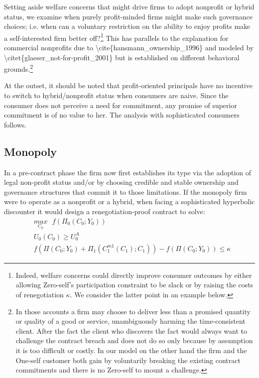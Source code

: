 \documentclass[11pt,english]{article}
\theoremstyle{plain}
\theoremstyle{definition}
\begin{document}
Setting aside welfare concerns that might drive firms to adopt nonprofit
or hybrid status, we examine when purely profit-minded firms might
make such governance choices; i.e. when can a voluntary restriction
on the ability to enjoy profits make a self-interested firm better
off?\footnote{Indeed, welfare concerns could directly improve consumer outcomes
by either allowing Zero-self's participation constraint to be slack
or by raising the costs of renegotiation $\kappa$. We consider the
latter point in an example below.} This has parallels to the explanation for commercial nonprofits due
to \textbackslash{}cite\{hansmann\_ownership\_1996\} and modeled by
\textbackslash{}citet\{glaeser\_not-for-profit\_2001\} but is established
on different behavioral grounds.\footnote{In those accounts a firm may choose to deliver less than a promised
quantity or quality of a good or service, unambiguously harming the
time-consistent client. After the fact the client who discovers the
fact would always want to challenge the contract breach and does not
do so only because by assumption it is too difficult or costly. In
our model on the other hand the firm and the One-self customer both
gain by voluntarily breaking the existing contract commitments and
there is no Zero-self to mount a challenge.} 

At the outset, it should be noted that profit-oriented principals
have no incentive to switch to hybrid/nonprofit status when consumers
are naive. Since the consumer does not perceive a need for commitment,
any promise of superior commitment is of no value to her. The analysis
with sophisticated consumers follows.

\subsection{Monopoly}

In a pre-contract phase the firm now first establishes its type via
the adoption of legal non-profit status and/or by choosing credible
and stable ownership and governance structures that commit it to those
limitations. If the monopoly firm were to operate as a nonprofit or
a hybrid, when facing a sophisticated hyperbolic discounter it would
design a renegotiation-proof contract to solve:
\begin{align}
 & \underset{C_{0}}{max}\text{ }f\left(\Pi_{0}\left(C_{0};Y_{0}\right)\right)\\
 & U_{0}\left(C_{0}\right)\geq U_{0}^{A}\\
 & f\left(\Pi\left(C_{0};Y_{0}\right)+\Pi_{1}\left(C_{1}^{m1}\left(C_{1}\right);C_{1}\right)\right)-f\left(\Pi\left(C_{0};Y_{0}\right)\right)\leq\kappa\label{eq:no-reneg-np}
\end{align}
\end{document}
